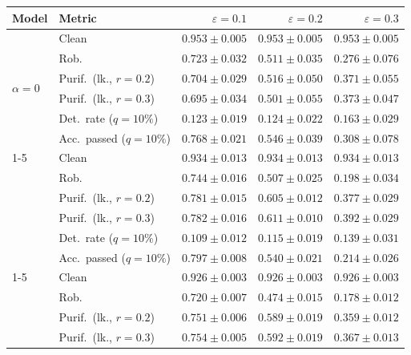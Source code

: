 \begin{table}[htbp]
  \centering
  \small
  \begin{tabular}{@{}llrrr@{}}
    \toprule
    Model & Metric & $\varepsilon=0.1$ & $\varepsilon=0.2$ & $\varepsilon=0.3$ \\
    \midrule
    \multirow{6}{*}{$\alpha{=}0$} & Clean & $\mathbf{0.953 \pm 0.005}$ & $\mathbf{0.953 \pm 0.005}$ & $\mathbf{0.953 \pm 0.005}$ \\
     & Rob. & $0.723 \pm 0.032$ & $\mathbf{0.511 \pm 0.035}$ & $\mathbf{0.276 \pm 0.076}$ \\
     & Purif.\ (lk., $r{=}0.2$) & $0.704 \pm 0.029$ & $0.516 \pm 0.050$ & $0.371 \pm 0.055$ \\
     & Purif.\ (lk., $r{=}0.3$) & $0.695 \pm 0.034$ & $0.501 \pm 0.055$ & $0.373 \pm 0.047$ \\
     & Det.\ rate ($q{=}10\%$) & $0.123 \pm 0.019$ & $0.124 \pm 0.022$ & $0.163 \pm 0.029$ \\
     & Acc.\ passed ($q{=}10\%$) & $0.768 \pm 0.021$ & $\mathbf{0.546 \pm 0.039}$ & $\mathbf{0.308 \pm 0.078}$ \\
    \cmidrule(lr){1-5}
    \multirow{6}{*}{$\alpha{=}0.01$} & Clean & $0.934 \pm 0.013$ & $0.934 \pm 0.013$ & $0.934 \pm 0.013$ \\
     & Rob. & $\mathbf{0.744 \pm 0.016}$ & $0.507 \pm 0.025$ & $0.198 \pm 0.034$ \\
     & Purif.\ (lk., $r{=}0.2$) & $\mathbf{0.781 \pm 0.015}$ & $\mathbf{0.605 \pm 0.012}$ & $\mathbf{0.377 \pm 0.029}$ \\
     & Purif.\ (lk., $r{=}0.3$) & $\mathbf{0.782 \pm 0.016}$ & $\mathbf{0.611 \pm 0.010}$ & $\mathbf{0.392 \pm 0.029}$ \\
     & Det.\ rate ($q{=}10\%$) & $0.109 \pm 0.012$ & $0.115 \pm 0.019$ & $0.139 \pm 0.031$ \\
     & Acc.\ passed ($q{=}10\%$) & $\mathbf{0.797 \pm 0.008}$ & $0.540 \pm 0.021$ & $0.214 \pm 0.026$ \\
    \cmidrule(lr){1-5}
    \multirow{6}{*}{$\alpha{=}0.1$} & Clean & $0.926 \pm 0.003$ & $0.926 \pm 0.003$ & $0.926 \pm 0.003$ \\
     & Rob. & $0.720 \pm 0.007$ & $0.474 \pm 0.015$ & $0.178 \pm 0.012$ \\
     & Purif.\ (lk., $r{=}0.2$) & $0.751 \pm 0.006$ & $0.589 \pm 0.019$ & $0.359 \pm 0.012$ \\
     & Purif.\ (lk., $r{=}0.3$) & $0.754 \pm 0.005$ & $0.592 \pm 0.019$ & $0.367 \pm 0.013$ \\

\end{tabular}
\end{table}
